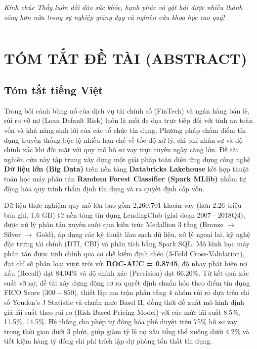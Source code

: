 \documentclass[
  13pt,
  a4paper,
]{report}
\begin{document}
\emph{Kính chúc Thầy luôn dồi dào sức khỏe, hạnh phúc và gặt hái được
nhiều thành công hơn nữa trong sự nghiệp giảng dạy và nghiên cứu khoa
học cao quý!}

\newpage

\begin{center}\rule{0.5\linewidth}{0.5pt}\end{center}

\section{TÓM TẮT ĐỀ TÀI
(ABSTRACT)}\label{tuxf3m-tux1eaft-ux111ux1ec1-tuxe0i-abstract}

\subsection{Tóm tắt tiếng
Việt}\label{tuxf3m-tux1eaft-tiux1ebfng-viux1ec7t}

Trong bối cảnh bùng nổ của dịch vụ tài chính số (FinTech) và ngân hàng
bán lẻ, rủi ro vỡ nợ (Loan Default Risk) luôn là mối đe dọa trực tiếp
đối với tính an toàn vốn và khả năng sinh lời của các tổ chức tín dụng.
Phương pháp chấm điểm tín dụng truyền thống bộc lộ nhiều hạn chế về tốc
độ xử lý, chi phí nhân sự và độ chính xác khi đối mặt với quy mô hồ sơ
vay trực tuyến ngày càng lớn. Đề tài nghiên cứu này tập trung xây dựng
một giải pháp toàn diện ứng dụng công nghệ \textbf{Dữ liệu lớn (Big
Data)} trên nền tảng \textbf{Databricks Lakehouse} kết hợp thuật toán
học máy phân tán \textbf{Random Forest Classifier (Spark MLlib)} nhằm tự
động hóa quy trình thẩm định tín dụng và ra quyết định cấp vốn.

Dữ liệu thực nghiệm quy mô lớn bao gồm 2,260,701 khoản vay (hơn 2.26
triệu bản ghi, 1.6 GB) từ nền tảng tín dụng LendingClub (giai đoạn 2007
- 2018Q4), được xử lý phân tán xuyên suốt qua kiến trúc Medallion 3 tầng
(Bronze \(\rightarrow\) Silver \(\rightarrow\) Gold), áp dụng các kỹ
thuật làm sạch dữ liệu, xử lý ngoại lai, kỹ nghệ đặc trưng tài chính
(DTI, CBI) và phân tích bằng Spark SQL. Mô hình học máy phân tán được
tinh chỉnh qua cơ chế kiểm định chéo (3-Fold Cross-Validation), đạt chỉ
số phân loại vượt trội với \textbf{ROC-AUC = 0.8745}, độ nhạy phát hiện
nợ xấu (Recall) đạt 84.04\% và độ chính xác (Precision) đạt 66.20\%. Từ
kết quả xác suất vỡ nợ, đề tài xây dựng động cơ ra quyết định chuẩn hóa
theo điểm tín dụng FICO Score (\(300 - 850\)), thiết lập ma trận phân
tầng 4 nhóm rủi ro dựa trên chỉ số Youden's J Statistic và chuẩn mực
Basel II, đồng thời đề xuất mô hình định giá lãi suất theo rủi ro
(Risk-Based Pricing Model) với các mức lãi suất 8.5\%, 11.5\%, 14.5\%.
Hệ thống cho phép tự động hóa phê duyệt trên 75\% hồ sơ vay trong thời
gian dưới 3 phút, giúp giảm tỷ lệ nợ xấu tổng thể xuống dưới 4.2\% và
tiết kiệm hàng tỷ đồng chi phí trích lập dự phòng tổn thất tín dụng.
\end{document}
